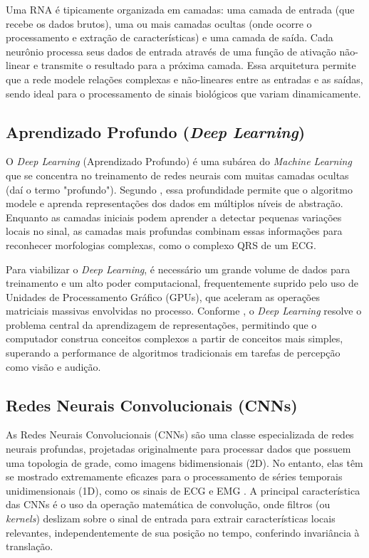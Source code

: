 \documentclass[tcc,capa]{texufpel}
\begin{document}
Uma RNA é tipicamente organizada em camadas: uma camada de entrada (que recebe os dados brutos), uma ou mais camadas ocultas (onde ocorre o processamento e extração de características) e uma camada de saída. Cada neurônio processa seus dados de entrada através de uma função de ativação não-linear e transmite o resultado para a próxima camada. Essa arquitetura permite que a rede modele relações complexas e não-lineares entre as entradas e as saídas, sendo ideal para o processamento de sinais biológicos que variam dinamicamente.

\subsection{Aprendizado Profundo (\textit{Deep Learning})}

O \textit{Deep Learning} (Aprendizado Profundo) é uma subárea do \textit{Machine Learning} que se concentra no treinamento de redes neurais com muitas camadas ocultas (daí o termo "profundo"). Segundo \citet{dsa2022}, essa profundidade permite que o algoritmo modele e aprenda representações dos dados em múltiplos níveis de abstração. Enquanto as camadas iniciais podem aprender a detectar pequenas variações locais no sinal, as camadas mais profundas combinam essas informações para reconhecer morfologias complexas, como o complexo QRS de um ECG.

Para viabilizar o \textit{Deep Learning}, é necessário um grande volume de dados para treinamento e um alto poder computacional, frequentemente suprido pelo uso de Unidades de Processamento Gráfico (GPUs), que aceleram as operações matriciais massivas envolvidas no processo. Conforme \cite{goodfellow2016}, o \textit{Deep Learning} resolve o problema central da aprendizagem de representações, permitindo que o computador construa conceitos complexos a partir de conceitos mais simples, superando a performance de algoritmos tradicionais em tarefas de percepção como visão e audição.

\subsection{Redes Neurais Convolucionais (CNNs)}

As Redes Neurais Convolucionais (CNNs) são uma classe especializada de redes neurais profundas, projetadas originalmente para processar dados que possuem uma topologia de grade, como imagens bidimensionais (2D). No entanto, elas têm se mostrado extremamente eficazes para o processamento de séries temporais unidimensionais (1D), como os sinais de ECG e EMG \cite{lomoio2024}. A principal característica das CNNs é o uso da operação matemática de convolução, onde filtros (ou \textit{kernels}) deslizam sobre o sinal de entrada para extrair características locais relevantes, independentemente de sua posição no tempo, conferindo invariância à translação.
\end{document}
